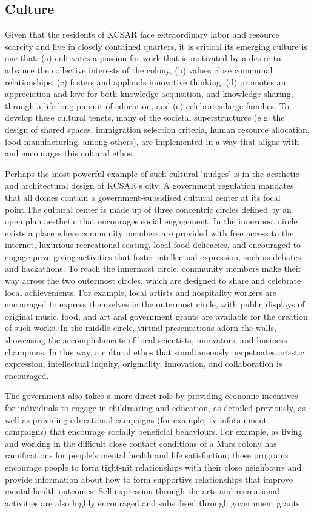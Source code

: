 \documentclass[fleqn,10pt]{Stylesheet} %
\begin{document}
\subsection{Culture}
Given that the residents of KCSAR face extraordinary labor and resource scarcity and live in closely contained quarters, it is critical its emerging culture is one that: (a) cultivates a passion for work that is motivated by a desire to advance the collective interests of the colony, (b) values close communal relationships, (c) fosters and applauds innovative thinking, (d) promotes an appreciation and love for both knowledge acquisition, and knowledge sharing, through a life-long pursuit of education, and (e) celebrates large families. To develop these cultural tenets, many of the societal superstructures (e.g. the design of shared spaces, immigration selection criteria, human resource allocation, food manufacturing, among others), are implemented in a way that aligns with and encourages this cultural ethos.

Perhaps the most powerful example of such cultural 'nudges' is in the aesthetic and architectural design of KCSAR's city. A government regulation mandates that all domes contain a government-subsidised cultural center at its focal point.The cultural center is made up of three concentric circles defined by an open plan aesthetic that encourages social engagement. In the innermost circle exists a place where community members are provided with free access to the internet, luxurious recreational seating, local food delicacies, and encouraged to engage prize-giving activities that foster intellectual expression, such as debates and hackathons. To reach the innermost circle, community members make their way across the two outermost circles, which are designed to share and celebrate local achievements. For example, local artists and hospitality workers are encouraged to express themselves in the outermost circle, with public displays of original music, food, and art and government grants are available for the creation of such works. In the middle circle, virtual presentations adorn the walls, showcasing the accomplishments of local scientists, innovators, and business champions. In this way, a cultural ethos that simultaneously perpetuates artistic expression, intellectual inquiry, originality, innovation, and collaboration is encouraged. 

The government also takes a more direct role by providing economic incentives for individuals to engage in childrearing and education, as detailed previously, as well as providing educational campaigns (for example, tv infotainment campaigns) that encourage socially beneficial behaviours. For example, as living and working in the difficult close contact conditions of a Mars colony has ramifications for people's mental health and life satisfaction, these programs encourage people to form tight-nit relationships with their close neighbours and provide information about how to form supportive relationships that improve mental health outcomes. Self expression through the arts and recreational activities are also highly encouraged and subsidised through government grants.
\end{document}
